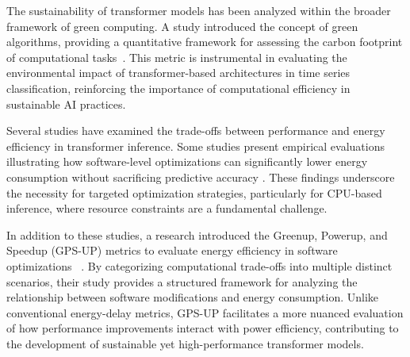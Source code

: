 The sustainability of transformer models has been analyzed within the broader framework of green computing. A study introduced the concept of green algorithms, providing a quantitative framework for assessing the carbon footprint of computational tasks~\cite{Lannelongue2021}. This metric is instrumental in evaluating the environmental impact of transformer-based architectures in time series classification, reinforcing the importance of computational efficiency in sustainable AI practices.

Several studies have examined the trade-offs between performance and energy efficiency in transformer inference. Some studies present empirical evaluations illustrating how software-level optimizations can significantly lower energy consumption without sacrificing predictive accuracy \cite{Bannour2021,dice2021optimizing}. These findings underscore the necessity for targeted optimization strategies, particularly for CPU-based inference, where resource constraints are a fundamental challenge.

In addition to these studies, a research introduced the Greenup, Powerup, and Speedup (GPS-UP) metrics to evaluate energy efficiency in software optimizations ~\cite{abdulsalam2015using}. By categorizing computational trade-offs into multiple distinct scenarios, their study provides a structured framework for analyzing the relationship between software modifications and energy consumption. Unlike conventional energy-delay metrics, GPS-UP facilitates a more nuanced evaluation of how performance improvements interact with power efficiency, contributing to the development of sustainable yet high-performance transformer models.